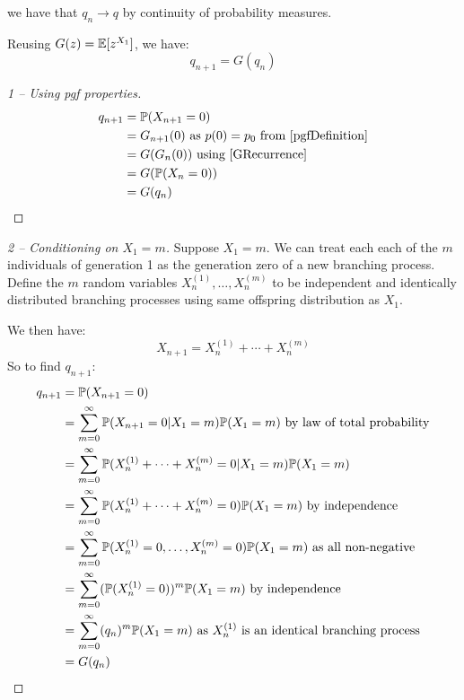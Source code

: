\documentclass[../main.tex]{subfiles}
\begin{document}
we have that $q_n \to q$ by continuity of probability measures.
\begin{proposition}
  Reusing $G(z) = \E[z^{X_1}]$, we have:
  \label{extinctionRecurrence}
  \[
    q_{n + 1} = G(q_n)
  \]
\end{proposition}
\begin{proof}[1 -- Using pgf properties]
  \begin{align*}
    q_{n + 1} &= \P(X_{n + 1} = 0) \\
              &= G_{n + 1}(0) \text{ as $p(0) = p_0$ from \cref{pgfDefinition}} \\
              &= G(G_n(0)) \text{ using \cref{GRecurrence}} \\
              &= G(\P(X_n = 0)) \\
              &= G(q_n)
  \end{align*}
\end{proof}
\begin{proof}[2 -- Conditioning on $X_1 = m$]\par
  Suppose $X_1 = m$.
  We can treat each each of the $m$ individuals of generation 1 as the generation zero of a new branching process.
  Define the $m$ random variables $X^{(1)}_{n}, \ldots, X^{(m)}_{n}$ to be independent and identically distributed branching processes using same offspring distribution as $X_1$.

  We then have:
  \[
    X_{n + 1} = X^{(1)}_n + \cdots + X^{(m)}_n
  \]
  So to find $q_{n + 1}$:
  \begin{align*}
    q_{n + 1} &= \P(X_{n + 1} = 0) \\
              &= \sum_{m = 0}^{\infty} \P(X_{n + 1} = 0 \vert X_1 = m) \P(X_1 = m) \text{ by law of total probability} \\
              &= \sum_{m = 0}^{\infty} \P(X^{(1)}_n + \cdots + X^{(m)}_n = 0 \vert X_1 = m)\P(X_1 = m) \\
              &= \sum_{m = 0}^{\infty} \P(X^{(1)}_n + \cdots + X^{(m)}_n = 0)\P(X_1 = m) \text{ by independence} \\
              &= \sum_{m = 0}^{\infty} \P(X^{(1)}_n = 0, \ldots, X^{(m)}_n = 0)\P(X_1 = m) \text{ as all non-negative} \\
              &= \sum_{m = 0}^{\infty} (\P(X^{(1)}_n = 0))^{m} \P(X_1 = m) \text{ by independence} \\
              &= \sum_{m = 0}^{\infty} (q_n)^{m} \P(X_1 = m) \text{ as $X^{(1)}_n$ is an identical branching process} \\
              &= G(q_n)
  \end{align*}
\end{proof}
\end{document}
